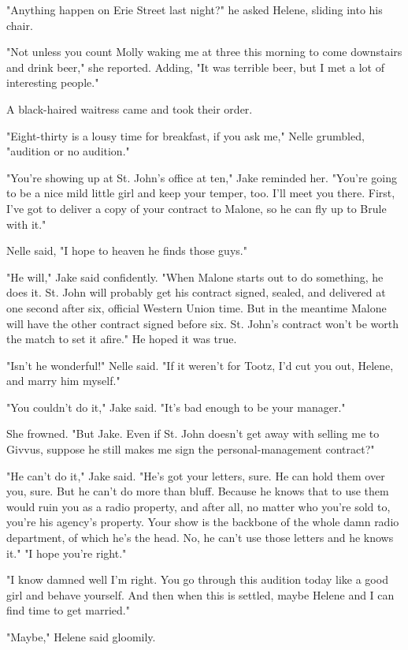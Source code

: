\documentclass{novel}
\begin{document}
"Anything happen on Erie Street last night?" he asked Helene, sliding into his chair.

"Not unless you count Molly waking me at three this morning to come downstairs and drink beer," she reported. Adding, "It was terrible beer, but I met a lot of interesting people."

A black-haired waitress came and took their order.

"Eight-thirty is a lousy time for breakfast, if you ask me," Nelle grumbled, "audition or no audition."

"You're showing up at St. John's office at ten," Jake reminded her. "You're going to be a nice mild little girl and keep your temper, too. I'll meet you there. First, I've got to deliver a copy of your contract to Malone, so he can fly up to Brule with it."

Nelle said, "I hope to heaven he finds those guys."

"He will," Jake said confidently. "When Malone starts out to do something, he does it. St. John will probably get his contract signed, sealed, and delivered at one second after six, official Western Union time. But in the meantime Malone will have the other contract signed before six. St. John's contract won't be worth the match to set it afire." He hoped it was true.

"Isn't he wonderful!" Nelle said. "If it weren't for Tootz, I'd cut you out, Helene, and marry him myself."

"You couldn't do it," Jake said. "It's bad enough to be your manager."

She frowned. "But Jake. Even if St. John doesn't get away with selling me to Givvus, suppose he still makes me sign the personal-management contract?"

"He can't do it," Jake said. "He's got your letters, sure. He can hold them over you, sure. But he can't do more than bluff. Because he knows that to use them would ruin you as a radio property, and after all, no matter who you're sold to, you're his agency's property. Your show is the backbone of the whole damn radio department, of which he's the head. No, he can't use those letters and he knows it." "I hope you're right."

"I know damned well I'm right. You go through this audition today like a good girl and behave yourself. And then when this is settled, maybe Helene and I can find time to get married."

"Maybe," Helene said gloomily.
\end{document}

